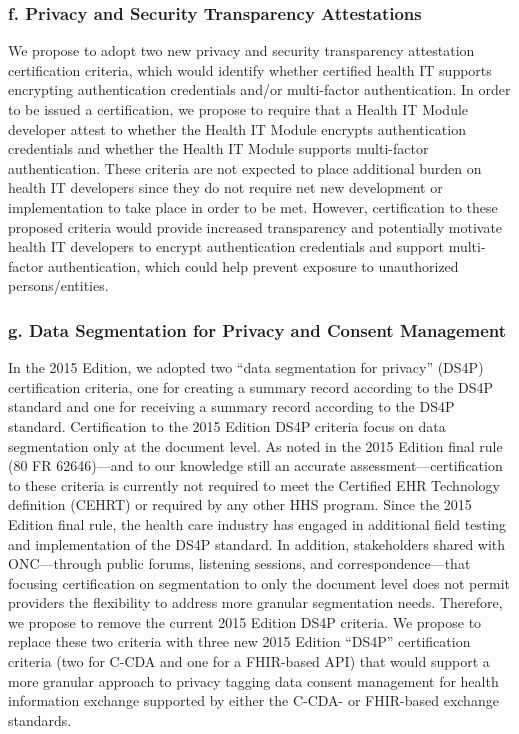 \documentclass[twoside,11pt]{article}
\begin{document}


          \subsubsection{f. Privacy and Security Transparency Attestations}

          We propose to adopt two new privacy and security transparency attestation certification criteria, which would identify whether certified health IT supports encrypting authentication credentials and/or multi-factor authentication. In order to be issued a certification, we propose to require that a Health IT Module developer attest to whether the Health IT Module encrypts authentication credentials and whether the Health IT Module supports multi-factor authentication. These criteria are not expected to place additional burden on health IT developers since they do not require net new development or implementation to take place in order to be met. However, certification to these proposed criteria would provide increased transparency and potentially motivate health IT developers to encrypt authentication credentials and support multi- factor authentication, which could help prevent exposure to unauthorized persons/entities.


          \subsubsection{g. Data Segmentation for Privacy and Consent Management}


          In the 2015 Edition, we adopted two “data segmentation for privacy” (DS4P) certification criteria, one for creating a summary record according to the DS4P standard and one for receiving a summary record according to the DS4P standard. Certification to the 2015 Edition DS4P criteria focus on data segmentation only at the document level. As noted in the 2015 Edition final rule (80 FR 62646)—and to our knowledge still an accurate assessment—certification to these criteria is currently not required to meet the Certified EHR Technology definition  \ifhmode\expandafter\xspace\fi (CEHRT) or required by any other HHS program. Since the 2015 Edition final rule, the health care industry has engaged in additional field testing and implementation of the DS4P standard. In addition, stakeholders shared with ONC—through public forums, listening sessions, and correspondence—that focusing certification on segmentation to only the document level does not permit providers the flexibility to address more granular segmentation needs. Therefore, we propose to remove the current 2015 Edition DS4P criteria. We propose to replace these two criteria with three new 2015 Edition “DS4P” certification criteria (two for C-CDA and one for a FHIR-based API) that would support a more granular approach to privacy tagging data consent management for health information exchange supported by either the C-CDA- or FHIR-based exchange standards.
\end{document}
